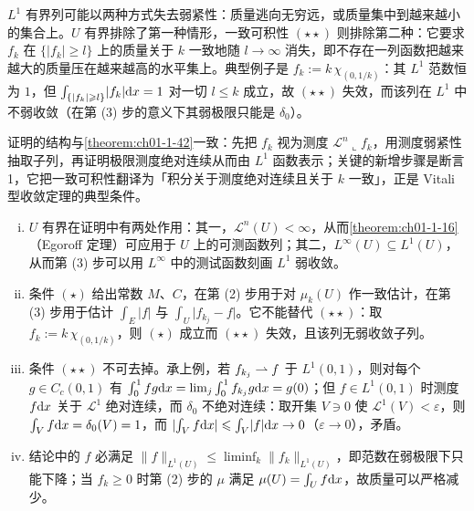 \documentclass[../../main.tex]{subfiles}%
\begin{document}
\begin{remark}\label{remark:ch01-thm-1-43-动机}
$L^1$ 有界列可能以两种方式失去弱紧性：质量逃向无穷远，或质量集中到越来越小的集合上。$U$ 有界排除了第一种情形，一致可积性 $(\star\star)$ 则排除第二种：它要求 $f_k$ 在 $\{\lvert f_k\rvert\geqslant l\}$ 上的质量关于 $k$ 一致地随 $l\to\infty$ 消失，即不存在一列函数把越来越大的质量压在越来越高的水平集上。典型例子是 $f_k:=k\,\chi_{(0,1/k)}$：其 $L^1$ 范数恒为 $1$，但 $\int_{\{\lvert f_k\rvert\geqslant l\}}\lvert f_k\rvert\mathrm{d} x=1$ 对一切 $l\leqslant k$ 成立，故 $(\star\star)$ 失效，而该列在 $L^1$ 中不弱收敛（在第 (3) 步的意义下其弱极限只能是 $\delta_0$）。

证明的结构与\cref{theorem:ch01-1-42}一致：先把 $f_k$ 视为测度 $\mathcal{L}^n\llcorner f_k$，用测度弱紧性抽取子列，再证明极限测度绝对连续从而由 $L^1$ 函数表示；关键的新增步骤是断言 1，它把一致可积性翻译为「积分关于测度绝对连续且关于 $k$ 一致」，正是 Vitali 型收敛定理的典型条件。%
\end{remark}

\begin{remark}\label{remark:ch01-thm-1-43-条件}
\begin{enumerate}[(i)]
\item $U$ 有界在证明中有两处作用：其一，$\mathcal{L}^n(U)<\infty$，从而\cref{theorem:ch01-1-16}（Egoroff 定理）可应用于 $U$ 上的可测函数列；其二，$L^\infty(U)\subseteq L^1(U)$，从而第 (3) 步可以用 $L^\infty$ 中的测试函数刻画 $L^1$ 弱收敛。%
\item 条件 $(\star)$ 给出常数 $M$、$C$，在第 (2) 步用于对 $\mu_k(U)$ 作一致估计，在第 (3) 步用于估计 $\int_E\lvert f\rvert$ 与 $\int_U\lvert f_{k_j}-f\rvert$。它不能替代 $(\star\star)$：取 $f_k:=k\,\chi_{(0,1/k)}$，则 $(\star)$ 成立而 $(\star\star)$ 失效，且该列无弱收敛子列。
\item 条件 $(\star\star)$ 不可去掉。承上例，若 $f_{k_j}\rightharpoonup f$ 于 $L^1(0,1)$，则对每个 $g\in C_c(0,1)$ 有 $\int_0^1fg\mathrm{d} x=\lim_j\int_0^1f_{k_j}g\mathrm{d} x=g(0)$；但 $f\in L^1(0,1)$ 时测度 $f\mathrm{d} x$ 关于 $\mathcal{L}^1$ 绝对连续，而 $\delta_0$ 不绝对连续：取开集 $V\ni0$ 使 $\mathcal{L}^1(V)<\varepsilon$，则 $\int_Vf\mathrm{d} x=\delta_0(V)=1$，而 $\lvert\int_Vf\mathrm{d} x\rvert\leqslant\int_V\lvert f\rvert\mathrm{d} x\to0$（$\varepsilon\to0$），矛盾。
\item 结论中的 $f$ 必满足 $\lVert f\rVert_{L^1(U)}\leqslant\liminf_k\lVert f_k\rVert_{L^1(U)}$，即范数在弱极限下只能下降；当 $f_k\geqslant0$ 时第 (2) 步的 $\mu$ 满足 $\mu(U)=\int_Uf\mathrm{d} x$，故质量可以严格减少。
\end{enumerate}
\end{remark}
\end{document}
